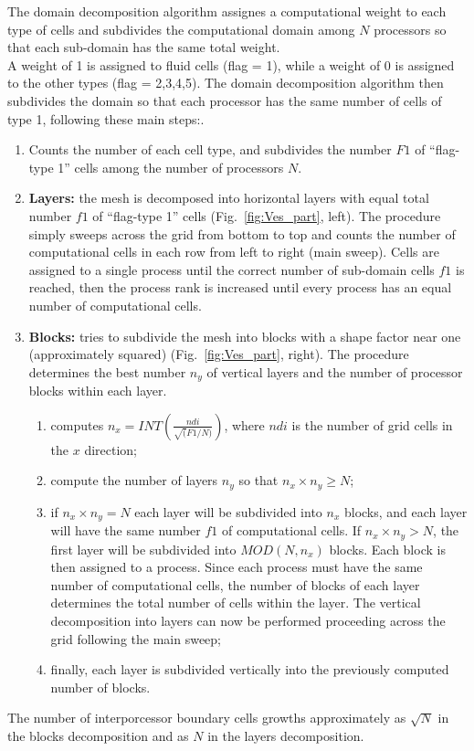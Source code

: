The domain decomposition algorithm assignes a computational weight to each type 
of cells and subdivides the computational domain
among $N$ processors so that each sub-domain has the same total weight.\\
A weight of 1 is assigned to fluid cells (flag = 1),
while a weight of 0 is assigned to the other types (flag = 2,3,4,5). 
The domain decomposition algorithm then subdivides the domain so that each processor
has the same number of cells of type 1, following these main steps:.\\
\begin{enumerate}
\item Counts the number of each cell type, and subdivides the number $F1$ of ``flag-type 1''
cells among the number of processors $N$.
\item {\bf Layers:} the mesh is decomposed into horizontal layers with equal total number
$f1$ of ``flag-type 1'' cells (Fig.~\ref{fig:Ves_part}, left). The procedure simply sweeps across
the grid from bottom to top and counts the number of computational cells in each row from
left to right (main sweep). Cells are assigned to a single process until the correct number 
of sub-domain cells $f1$ is reached, then the process rank is increased until every 
process has an equal number of computational cells.
\item {\bf Blocks:} tries to subdivide the mesh into blocks with a shape factor near one
(approximately squared) (Fig.~\ref{fig:Ves_part}, right). The procedure determines the best number
$n_y$ of vertical layers and the number of processor blocks within each layer.
\begin{enumerate}
\item computes $\displaystyle n_x = INT\left(\frac{ndi}{\sqrt(F1/N)}\right)$, where $ndi$ is the
number of grid cells in the $x$ direction;
\item compute the number of layers $n_y$ so that $n_x \times n_y \ge N$;
\item if $n_x \times n_y = N$ each layer will be subdivided into $n_x$ blocks, and each layer
will have the same number $f1$ of computational cells. If $n_x \times n_y > N$, the first 
layer will be subdivided into $MOD(N,n_x)$ blocks. Each block is then assigned to 
a process. Since each process must have the same number of computational cells, the number
of blocks of each layer determines the total number of cells within the layer. The vertical
decomposition into layers can now be performed proceeding across the grid following the
main sweep;
\item finally, each layer is subdivided vertically into the previously computed number
of blocks. 
\end{enumerate}
\end{enumerate}
The number of interporcessor boundary cells growths approximately as $\sqrt{N}$ in the blocks
decomposition and as $N$ in the layers decomposition.\\

